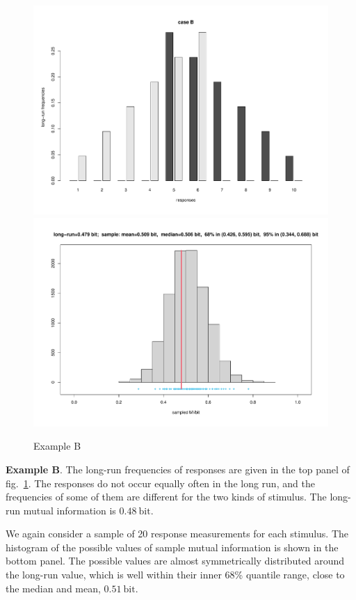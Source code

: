 \documentclass[\ifafour a4paper,12pt,\else a5paper,10pt,\fi%
onecolumn,oneside,article,%
british%
]{memoir}
\theoremstyle{remark}
\theoremstyle{innote}
\renewcommand*{\|}[1][]{\nonscript\,#1\vert\nonscript\;\mathopen{}}
\newcommand*{\fig}{fig.}%
\newcommand*{\bit}{\mathrm{bit}}
\begin{document}
\begin{figure}[p]%
\centering\includegraphics[width=\linewidth]{scripts/resp_caseB.pdf}\\%
\includegraphics[width=\linewidth]{scripts/histo_caseB.pdf}\\
\caption{Example B}\label{fig:resp_caseB}
\end{figure}%
\textbf{Example B}. The long-run frequencies of responses are given in the top
panel of \fig~\ref{fig:resp_caseB}. The responses do not occur equally
often in the long run, and the frequencies of some of them are different
for the two kinds of stimulus. The long-run mutual information is
$0.48\:\bit$.

We again consider a sample of 20 response measurements for each stimulus.
The histogram of the possible values of sample mutual information is shown
in the bottom panel. The possible values are almost symmetrically
distributed around the long-run value, which is well within their inner
68\% quantile range, close to the median and mean, $0.51\:\bit$.
\end{document}

